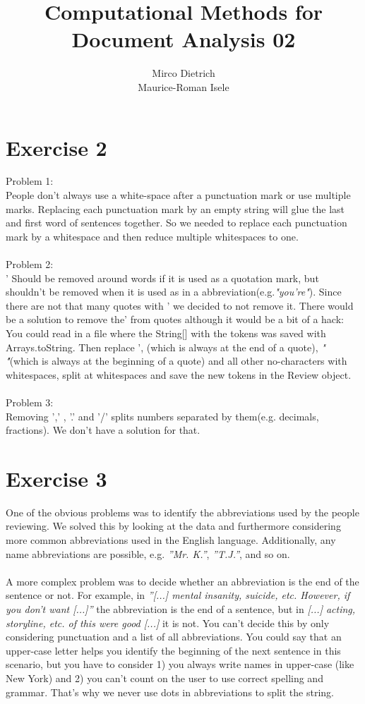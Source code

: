 \documentclass{article}
\title{Computational Methods for Document Analysis 02}
\author{Mirco Dietrich\\ Maurice-Roman Isele}
\begin{document}
\maketitle
\section*{Exercise 2}
Problem 1:\\
People don't always use a white-space after a punctuation mark or use multiple marks. Replacing each punctuation mark by an empty string will glue the last and first word of sentences together.
So we needed to replace each punctuation mark by a whitespace and then reduce multiple whitespaces to one.\\
\\
Problem 2:\\
' Should be removed around words if it is used as a quotation mark, but shouldn't be removed when it is used as in a abbreviation(e.g.\textit{"you're"}).
Since there are not that many quotes with ' we decided to not remove it.
There would be a solution to remove the' from quotes although it would be a bit of a hack:\\
You could read in a file where the String[] with the tokens was saved with Arrays.toString. Then replace ', (which is always at the end of a quote), \textit{" \'"}(which is always at the beginning of a quote) and all other no-characters with whitespaces, split at whitespaces and save the new tokens in the Review object.\\
\\
Problem 3:\\
Removing ',' , '.'  and '/' splits numbers separated by them(e.g. decimals, fractions). We don't have a solution for that.


\section*{Exercise 3}

One of the obvious problems was to identify the abbreviations used by the people reviewing. We solved this by looking at the data and furthermore considering more common abbreviations used in the English language. Additionally, any name abbreviations are possible, e.g. \textit{''Mr. K.''}, \textit{''T.J.''}, and so on. \\\\

A more complex problem was to decide whether an abbreviation is the end of the sentence or not. For example, in \textit{''[...] mental insanity, suicide, etc. However, if you don't want [...]''} the abbreviation is the end of a sentence, but in \textit{[...] acting, storyline, etc. of this were good [...]} it is not. You can't decide this by only considering punctuation and a list of all abbreviations. You could say that an upper-case letter helps you identify the beginning of the next sentence in this scenario, but you have to consider 1) you always write names in upper-case (like New York) and 2) you can't count on the user to use correct spelling and grammar. That's why we never use dots in abbreviations to split the string. \\
\end{document}
